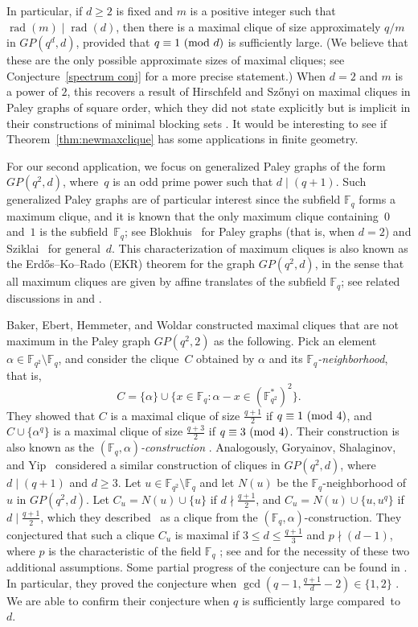 \documentclass[12pt,reqno]{amsart}
\theoremstyle{definition}
\newcommand{\F}{\mathbb{F}}
\newcommand{\rad}{\operatorname{rad}}
\renewcommand{\pmod}[1]{{\ifmmode\text{\rm\ (mod~$#1$)}\else\discretionary{}{}{\hbox{ }}\rm(mod~$#1$)\fi}}
\begin{document}
In particular, if $d \geq 2$ is fixed and $m$ is a positive integer such that $\rad(m) \mid \rad(d)$, then there is a maximal clique of size approximately $q/m$ in $GP(q^d,d)$, provided that $q \equiv 1 \pmod d$ is sufficiently large. (We believe that these are the only possible approximate sizes of maximal cliques; see Conjecture~\ref{spectrum conj} for a more precise statement.)  When $d=2$ and $m$
is a power of $2$, this recovers a result of Hirschfeld and Sz{\H{o}}nyi on maximal cliques in Paley graphs of square order, which they did not state explicitly but is implicit in their constructions of minimal blocking sets \cite{HS91, S92}. It would be interesting to see if Theorem~\ref{thm:newmaxclique} has some applications in finite geometry.

For our second application, we focus on generalized Paley graphs of the form $GP(q^2,d)$, where~$q$ is an odd prime power such that $d \mid (q+1)$. Such generalized Paley graphs are of particular interest since the subfield $\F_q$ forms a maximum clique, and it is known that the only maximum clique containing~$0$ and~$1$ is the subfield~$\F_q$; see Blokhuis~\cite{B84} for Paley graphs (that is, when $d=2$) and Sziklai~\cite{S99} for general~$d$. This characterization of maximum cliques is also known as the Erd\H{o}s--Ko--Rado (EKR) theorem for the graph $GP(q^2,d)$, in the sense that all maximum cliques are given by affine translates of the subfield $\F_q$; see related discussions in \cite{AY22, Y24} and \cite[Section~5.9]{GM15}.  

Baker, Ebert, Hemmeter,
and Woldar \cite{BEHW96} constructed maximal cliques that are not maximum in the Paley graph $GP(q^2,2)$ as the following. Pick an element $\alpha \in \F_{q^2}\setminus \F_q$, and consider the clique~$C$ obtained by $\alpha$ and its \emph{$\F_q$-neighborhood}, that is,
$$
C=\{\alpha\} \cup \{x \in \F_q: \alpha-x \in (\F_{q^2}^*)^2\}.
$$
They showed that $C$ is a maximal clique of size $\frac{q+1}{2}$ if $q \equiv 1 \pmod 4$, and $C \cup \{\alpha^q\}$ is a maximal clique of size $\frac{q+3}{2}$ if $q \equiv 3 \pmod 4$. Their construction is also known as the \emph{$(\F_q, \alpha)$-construction} \cite{GKSV18,GMS22}. Analogously, Goryainov, Shalaginov, and Yip~\cite{GSY23} considered a similar construction of cliques in $GP(q^2,d)$, where $d \mid (q+1)$ and $d \geq 3$. Let $u \in \F_{q^2} \setminus \F_q$ and let $N(u)$ be the $\F_q$-neighborhood of $u$ in $GP(q^2,d)$. Let $C_u=N(u)\cup \{u\}$ if 
$d \nmid \frac{q+1}{2}$, and $C_u=N(u) \cup \{u,u^q\}$ if $d \mid \frac{q+1}{2}$, which they described~\cite[Proposition 4.6]{GSY23} as a clique from the $(\F_q, \alpha)$-construction. They conjectured that such a clique $C_u$ is maximal if $3 \leq d \leq \frac{q+1}{3}$ and $p \nmid (d-1)$, where $p$ is the characteristic of the field $\F_q$ \cite[Conjecture 4.7]{GSY23}; see \cite[Corollary 3.4]{GSY23} and \cite[Example 5.9]{GSY23} for the necessity of these two additional assumptions. Some partial progress of the conjecture can be found in \cite[Section 5]{GSY23}. In particular, they proved the conjecture when $\gcd(q-1,\frac{q+1}{d}-2)\in \{1,2\}$ \cite[Corollary 5.4]{GSY23}. We are able to confirm their conjecture when $q$ is sufficiently large compared~to~$d$.
\end{document}
